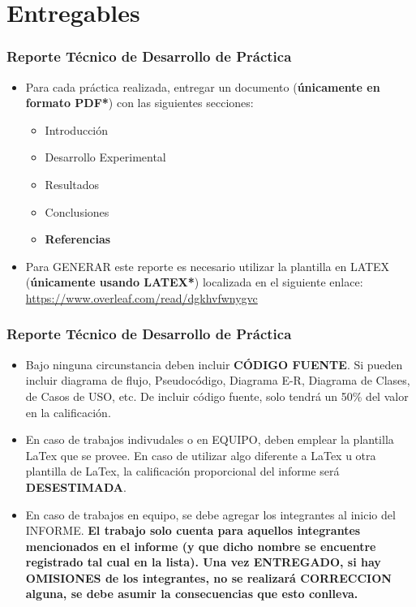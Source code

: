 

\section{Entregables}



\begin{frame}
\frametitle{Reporte Técnico de Desarrollo de Práctica}
\begin{itemize}
\item Para cada práctica realizada, entregar un documento (\textbf{únicamente en formato PDF*}) con las siguientes secciones:
\begin{itemize}
\item Introducción
\item Desarrollo Experimental
\item Resultados
\item Conclusiones
\item \textbf{Referencias}
\end{itemize}
\item Para GENERAR este reporte es necesario utilizar la plantilla en LATEX (\textbf{únicamente usando LATEX*}) localizada en el siguiente enlace:
\url{https://www.overleaf.com/read/dgkhvfwnygvc}
\end{itemize}
\end{frame}

\begin{frame}
\frametitle{Reporte Técnico de Desarrollo de Práctica}
\begin{itemize}
\item Bajo ninguna circunstancia deben incluir \textbf{CÓDIGO FUENTE}. Si pueden incluir diagrama de flujo, Pseudocódigo, Diagrama E-R, Diagrama de Clases, de Casos de USO, etc. De incluir código fuente, solo tendrá un 50\% del valor en la calificación. 
\item En caso de trabajos indivudales o en EQUIPO, deben emplear la plantilla LaTex que se provee. En caso de utilizar algo diferente a LaTex u otra plantilla de LaTex, la calificación proporcional del informe será \textbf{DESESTIMADA}. 
\item En caso de trabajos en equipo, se debe agregar los integrantes al inicio del INFORME. \textbf{El trabajo solo cuenta para aquellos integrantes mencionados en el informe (y que dicho nombre se encuentre registrado tal cual en la lista). Una vez ENTREGADO, si hay OMISIONES de los integrantes, no se realizará CORRECCION alguna, se debe asumir la consecuencias que esto conlleva. }
\end{itemize}

\end{frame}


